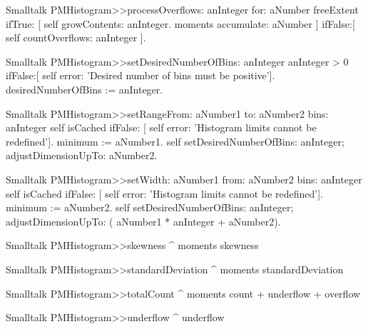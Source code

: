 \begin{displaycode}{Smalltalk}
PMHistogram>>processOverflows: anInteger for: aNumber
    freeExtent
        ifTrue: [ self growContents: anInteger.
                     moments accumulate: aNumber
                   ]
        ifFalse:[ self countOverflows: anInteger ].

\begin{displaycode}{Smalltalk}
PMHistogram>>setDesiredNumberOfBins: anInteger
    anInteger > 0
        ifFalse:[ self error: 'Desired number of bins must be 
                                                           positive'].
    desiredNumberOfBins := anInteger.
\end{displaycode}
  
\begin{displaycode}{Smalltalk}
PMHistogram>>setRangeFrom: aNumber1 to: aNumber2 bins: anInteger
    self isCached
        ifFalse: [ self error: 'Histogram limits cannot be 
                                                          redefined'].
    minimum := aNumber1.
    self setDesiredNumberOfBins: anInteger;
           adjustDimensionUpTo: aNumber2.
\end{displaycode}
         
\begin{displaycode}{Smalltalk}
PMHistogram>>setWidth: aNumber1 from: aNumber2 bins: anInteger
    self isCached
        ifFalse: [ self error: 'Histogram limits cannot be 
                                                          redefined'].
    minimum := aNumber2.
    self setDesiredNumberOfBins: anInteger;
           adjustDimensionUpTo: ( aNumber1 * anInteger + aNumber2).
\end{displaycode}
           
\begin{displaycode}{Smalltalk}
PMHistogram>>skewness
    ^ moments skewness
\end{displaycode}
  
\begin{displaycode}{Smalltalk}
PMHistogram>>standardDeviation
    ^ moments standardDeviation
\end{displaycode}
    
\begin{displaycode}{Smalltalk}
PMHistogram>>totalCount
    ^ moments count + underflow + overflow
\end{displaycode}
  
\begin{displaycode}{Smalltalk}
PMHistogram>>underflow
    ^ underflow
\end{displaycode}
  

\end{displaycode}
